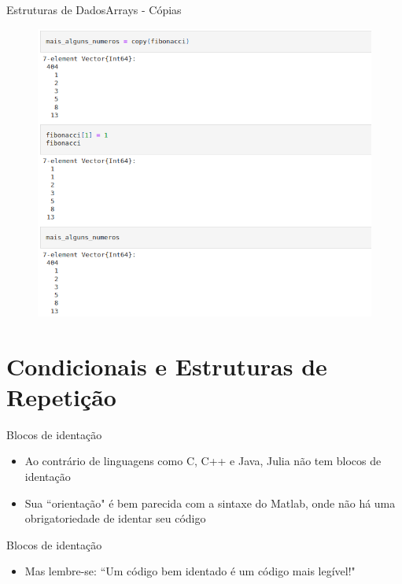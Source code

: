 \documentclass{beamer}
\begin{document}
\begin{frame}{Estruturas de Dados}{Arrays - Cópias}
    \begin{figure}
        \centering
        \includegraphics[scale=0.3]{imagens/array13.png}
        \label{fig:my_label}
    \end{figure}
\end{frame}

\section{Condicionais e Estruturas de Repetição}

\begin{frame}{Blocos de identação}
    \begin{itemize}
        \item Ao contrário de linguagens como C, C++ e Java, Julia não tem blocos de identação
        \item Sua ``orientação" é bem parecida com a sintaxe do Matlab, onde não há uma obrigatoriedade de identar seu código
    \end{itemize}
\end{frame}

\begin{frame}{Blocos de identação}
    \begin{itemize}
        \item Mas lembre-se: ``Um código bem identado é um código mais legível!"
    \end{itemize}
\end{frame}
\end{document}
